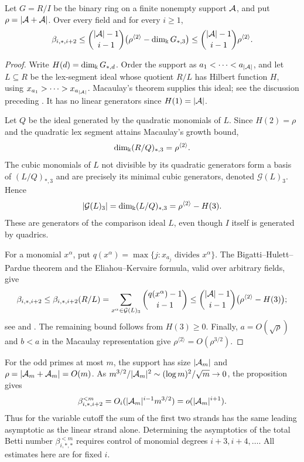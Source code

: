 \begin{proposition}\label{grow:nonlinear-bound}
Let $G=R/I$ be the binary ring on a finite nonempty support $\mathcal A$, and
put $\rho=|\mathcal A+\mathcal A|$.
Over every field and for every $i\ge1$,
\[
 \beta_{i,*,i+2}
 \le\binom{|\mathcal A|-1}{i-1}
       \bigl(\rho^{\langle2\rangle}-\dim_\Bbbk G_{*,3}\bigr)
 \le\binom{|\mathcal A|-1}{i-1}\rho^{\langle2\rangle}.
\]
\end{proposition}
\begin{proof}
Write $H(d)=\dim_\Bbbk G_{*,d}$. Order the support as
$a_1<\cdots<a_{|\mathcal A|}$, and let $L\subseteq R$ be the lex-segment ideal
whose quotient $R/L$ has Hilbert function $H$, using
$x_{a_1}>\cdots>x_{a_{|\mathcal A|}}$.
Macaulay's theorem supplies this ideal; see the discussion preceding
\cite[Lemmas~2--3]{JKV21}. It has no linear generators since $H(1)=|\mathcal A|$.

Let $Q$ be the ideal generated by the quadratic monomials of $L$.
Since $H(2)=\rho$ and the quadratic lex segment attains Macaulay's
growth bound,
\[
 \dim_\Bbbk(R/Q)_{*,3}=\rho^{\langle2\rangle}.
\]
The cubic monomials of $L$ not divisible by its quadratic generators
form a basis of $(L/Q)_{*,3}$ and are precisely its minimal cubic
generators, denoted $\mathcal G(L)_3$. Hence
\[
 |\mathcal G(L)_3|=\dim_\Bbbk(L/Q)_{*,3}
 =\rho^{\langle2\rangle}-H(3).
\]
These are generators of the comparison ideal $L$, even though $I$
itself is generated by quadrics.

For a monomial $x^\alpha$, put
$q(x^\alpha)=\max\{j:x_{a_j}\text{ divides }x^\alpha\}$.
The Bigatti--Hulett--Pardue theorem and the Eliahou--Kervaire formula,
valid over arbitrary fields, give
\[
 \beta_{i,*,i+2}\le\beta_{i,*,i+2}(R/L)
 =\sum_{x^\alpha\in\mathcal G(L)_3}\binom{q(x^\alpha)-1}{i-1}
 \le\binom{|\mathcal A|-1}{i-1}\bigl(\rho^{\langle2\rangle}-H(3)\bigr);
\]
see \cite[Lemmas~2--3]{JKV21} and \cite{EK90}.
The remaining bound follows from $H(3)\ge0$. Finally,
$a=O(\sqrt\rho)$ and $b<a$ in the Macaulay representation give
$\rho^{\langle2\rangle}=O(\rho^{3/2})$.
\end{proof}

For the odd primes at most $m$, the support has size $|\mathcal A_m|$ and
$\rho=|\mathcal A_m+\mathcal A_m|=O(m)$. As $m^{3/2}/|\mathcal A_m|^2\sim(\log m)^2/\sqrt m\to0$,
the proposition gives
\[
 \beta^{<m}_{i,*,i+2}
 =O_i(|\mathcal A_m|^{i-1}m^{3/2})=o(|\mathcal A_m|^{i+1}).
\]
Thus for the variable cutoff the sum of the first two strands has
the same leading asymptotic as the linear strand alone. Determining
the asymptotics of the total Betti number $\beta^{<m}_{i,*,*}$ requires
control of monomial degrees $i+3,i+4,\ldots$. All estimates here are for fixed $i$.
